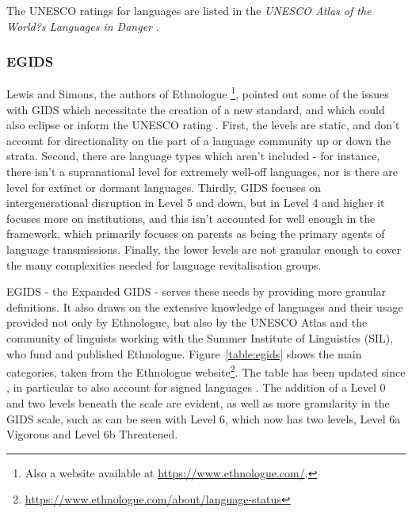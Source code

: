 The UNESCO ratings for languages are listed in the \textit{UNESCO Atlas of the World?s Languages in Danger} \citep{unesco2014unesco}.

\subsubsection{EGIDS}

Lewis and Simons, the authors of Ethnologue \citep{lewis2009ethnologue}\footnote{Also a website available at \href{https://www.ethnologue.com/}{https://www.ethnologue.com/}.}, pointed out some of the issues with GIDS which necessitate the creation of a new standard, and which could also eclipse or inform the UNESCO rating \citep{lewis2010assessing}. First, the levels are static, and don't account for directionality on the part of a language community up or down the strata. Second, there are language types which aren't included - for instance, there isn't a supranational level for extremely well-off languages, nor is there are level for extinct or dormant languages. Thirdly, GIDS focuses on intergenerational disruption in Level 5 and down, but in Level 4 and higher it focuses more on institutions, and this isn't accounted for well enough in the framework, which primarily focuses on parents as being the primary agents of language transmissions. Finally, the lower levels are not granular enough to cover the many complexities needed for language revitalisation groups.

EGIDS - the Expanded GIDS - serves these needs by providing more granular definitions. It also draws on the extensive knowledge of languages and their usage provided not only by Ethnologue, but also by the UNESCO Atlas and the community of linguists working with the Summer Institute of Linguistics (SIL), who fund and published Ethnologue. Figure~\ref{table:egids} shows the main categories, taken from the Ethnologue website\footnote{\href{https://www.ethnologue.com/about/language-status}{https://www.ethnologue.com/about/language-status}}. The table has been updated since \citet{lewis2010assessing}, in particular to also account for signed languages \citep{bickford2015rating}. The addition of a Level 0 and two levels beneath the scale are evident, as well as more granularity in the GIDS scale, such as can be seen with Level 6, which now has two levels, Level 6a Vigorous and Level 6b Threatened.

